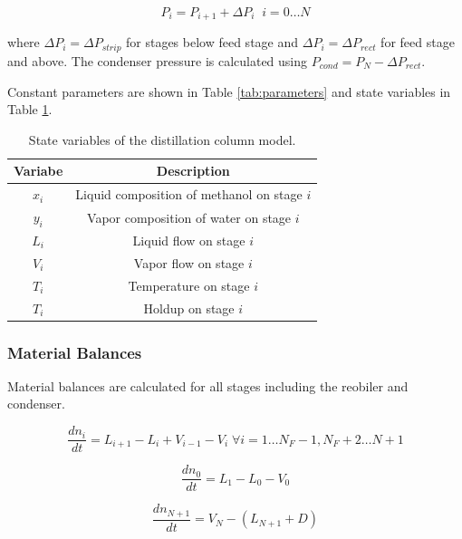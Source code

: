 \begin{equation}
    P_i = P_{i+1} + \Delta P_i \;\; i=0\dots N
\end{equation}

where $\Delta P_i =\Delta P_{strip}$ for stages below feed stage and $\Delta P_i =\Delta P_{rect}$ for feed stage and above. The condenser pressure is calculated using $P_{cond}=P_{N} - \Delta P_{rect}$.

Constant parameters are shown in Table \ref{tab:parameters} and state variables in Table \ref{tab:state_variables}.
\begin{table}
    \centering
    \caption{State variables of the distillation column model.}
    \begin{tabular}{cc}
        \textbf{Variabe} & \textbf{Description}  \\
        \hline
         $x_i$ &  Liquid composition of methanol on stage $i$ \\
         $y_i$ & Vapor composition of water on stage $i$\\
         $L_i$ & Liquid flow on stage $i$  \\
         $V_i$  & Vapor flow on stage $i$ \\
         $T_i$  & Temperature on stage $i$ \\
         $T_i$  & Holdup on stage $i$ \\
         \hline
    \end{tabular}
    
    \label{tab:state_variables}
\end{table}

\subsubsection{Material Balances}
Material balances are calculated for all stages including the reobiler and condenser.

\begin{equation}
\frac{dn_i}{dt} = L_{i+1}-L_i + V_{i-1}-V_i \; \forall i=1 \dots N_F-1, N_F+2 \dots N+1
\end{equation}

\begin{equation}
   \frac{dn_0}{dt} = L_1 - L_0 - V_0 
\end{equation}


\begin{equation}
    \frac{dn_{N+1}}{dt} = V_{N}-(L_{N+1} + D)    
\end{equation}


